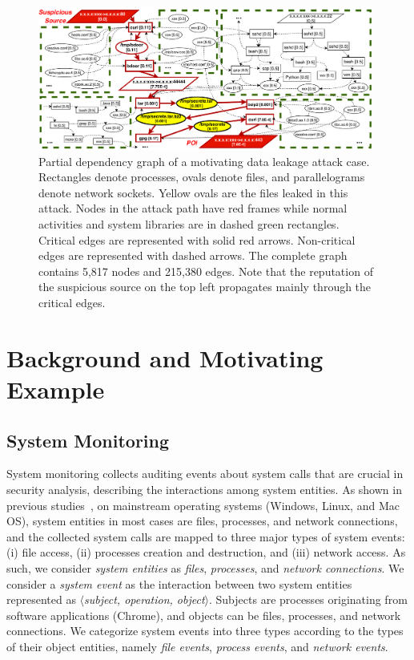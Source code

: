 
\begin{figure}[!t]
    \centering
    \includegraphics[width=0.98\textwidth]{figs/overview.pdf}
    \caption{Partial dependency graph of a motivating data leakage attack case. Rectangles denote processes, ovals denote files, and parallelograms denote network sockets. Yellow ovals are the files leaked in this attack. Nodes in the attack path have red frames while normal activities and system libraries are in dashed green rectangles. Critical edges are represented with solid red arrows. Non-critical edges are represented with dashed arrows. The complete graph contains 5,817 nodes and 215,380 edges. Note that the reputation of the suspicious source on the top left propagates mainly through the critical edges.}
    \label{fig:motivate}
\end{figure}

\section{Background and Motivating Example}
\subsection{System Monitoring}
\label{subsec:system-monitoring}

System monitoring collects auditing events about system calls that are crucial in security analysis, describing the interactions among system entities.
As shown in previous studies~\cite{backtracking,backtracking2,taser,wormlog,gao2018saql,gao2018aiql,mcitracking,logtracking,liu2018priotracker,hassan2019nodoze}, on mainstream operating systems (Windows, Linux, and Mac OS), system entities in most cases are files, processes, and network connections,
and the collected system calls are mapped to three major types of system events:
(i) file access, 
(ii) processes creation and destruction, and
(iii) network access.
As such, we consider \emph{system entities} as \emph{files}, \emph{processes}, and \emph{network connections}.
We consider a \emph{system event} as the interaction between two system entities represented as \emph{$\langle$subject, operation, object$\rangle$}. Subjects are processes originating from software applications (\eg Chrome), and objects can be files, processes, and network connections. 
We categorize system events into three types according to the types of their object entities, namely \emph{file events}, \emph{process events}, and \emph{network events}.


